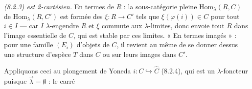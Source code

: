 \documentclass[11pt,a4paper]{article}
\begin{document}

\emph{(8.2.3) est 2-cartésien.} En termes de $R$ : la sous-catégorie pleine
$\mathrm{Hom}_{\lambda}(R, C)$ de $\mathrm{Hom}_{\lambda}(R, C')$ est formée des
$\xi : R \to C'$ tels que $\xi(\varphi(i)) \in C$ pour tout $i \in I$ — car
$I$ $\lambda$-engendre $R$ et $\xi$ commute aux $\lambda$-limites, donc
envoie tout $R$ dans l'image essentielle de $C$, qui est stable par ces
limites. « En termes imagés » : pour une famille $(E_{i})$ d'objets de $C$,
il revient au même de se donner dessus une structure d'espèce $T$ dans $C$
ou sur leurs images dans $C'$.

Appliquons ceci au plongement de Yoneda $i : C \hookrightarrow \widehat{C}$
(8.2.4), qui est un $\lambda$-foncteur puisque $\overrightarrow{\lambda} =
\emptyset$ : le carré

\end{document}
